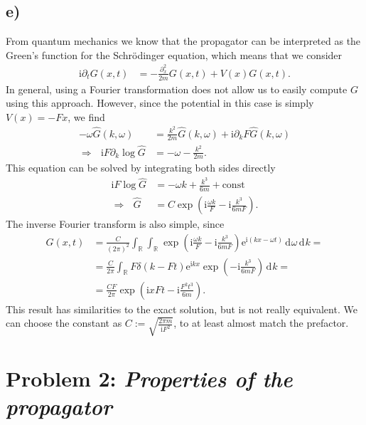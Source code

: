 \documentclass[english, parskip=full]{scrartcl}
\newcommand{\intr}{}
\newcommand{\kla}{}
\newcommand{\tecxt}{}
\renewcommand{\i}{\text{i}}
\newcommand{\e}{\text{e}}
\begin{document}
\subsection*{e)}
From quantum mechanics we know that the propagator can be interpreted as the Green's function for the Schrödinger equation, which means that we consider
\begin{align}
\i\partial_t G(x,t) &= -\frac{\partial_x^2}{2m}G(x,t) + V(x)G(x,t).
\end{align}
In general, using a Fourier transformation does not allow us to easily compute $G$ using this approach.
However, since the potential in this case is simply $V(x) = -Fx$, we find
\begin{align}
-\omega\hat{G}(k,\omega) &= \frac{k^2}{2m}\hat{G}(k,\omega) + \i\partial_k F\hat{G}(k,\omega)\\
\Rightarrow\ \ \ \i F\partial_k\log\hat{G} &= -\omega - \frac{k^2}{2m}.
\end{align}
This equation can be solved by integrating both sides directly
\begin{align}
\i F\log\hat{G} &= -\omega k + \frac{k^3}{6m} + \tecxt\text{const}\\
\Rightarrow\ \ \ \hat{G} &= C\exp\kla\left( \i\frac{\omega k}{F} - \i\frac{k^3}{6mF} \right).
\end{align}
The inverse Fourier transform is also simple, since
\begin{align}
G(x,t) &= \frac{C}{(2\pi)^2}\intr\int_{\mathbb{R}^{ }} \intr\int_{\mathbb{R}^{ }} \exp\kla\left( \i\frac{\omega k}{F} - \i\frac{k^3}{6mF} \right)\e^{\i (kx - \omega t)} \, \mathrm{d}^{ }\omega \, \mathrm{d}^{ }k = \\
&= \frac{C}{2\pi}\intr\int_{\mathbb{R}^{ }} F\delta (k - Ft)\e^{\i kx} \exp\kla\left( - \i\frac{k^3}{6mF} \right) \, \mathrm{d}^{ }k = \\
&= \frac{CF}{2\pi}\exp\kla\left( \i xFt - \i\frac{F^2t^3}{6m} \right).
\end{align}
This result has similarities to the exact solution, but is not really equivalent. 
We can choose the constant as $C := \sqrt{\frac{2\pi m}{\i F^2}}$, to at least almost match the prefactor.

\newpage
\section*{Problem 2: \normalfont\textit{\large{Properties of the propagator}}}
\end{document}
